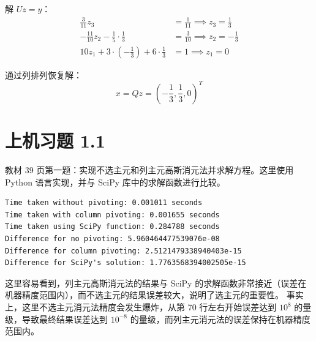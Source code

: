 \documentclass{article}
\begin{document}
\begin{solution}
  解 $Uz = y$：
  \begin{align*}
    \frac{3}{11} z_3 &= \frac{1}{11} \implies z_3 = \frac{1}{3} \\
    -\frac{11}{10} z_2 - \frac{1}{5} \cdot \frac{1}{3} &=
    \frac{3}{10} \implies z_2 = -\frac{1}{3} \\
    10 z_1 + 3 \cdot \left(-\frac{1}{3}\right) + 6 \cdot \frac{1}{3} &= 1
    \implies z_1 = 0
  \end{align*}

  通过列排列恢复解：
  \[
    x = Qz = \boxed{\left( -\frac{1}{3}, \frac{1}{3}, 0\right)^T}
  \]
\end{solution}

\section{上机习题 1.1}

教材 39 页第一题：实现不选主元和列主元高斯消元法并求解方程。这里使用 Python 语言实现，并与 SciPy 库中的求解函数进行比较。



\begin{lstlisting}[language={},caption=运行结果]
Time taken without pivoting: 0.001011 seconds
Time taken with column pivoting: 0.001655 seconds
Time taken using SciPy function: 0.284788 seconds
Difference for no pivoting: 5.960464477539076e-08
Difference for column pivoting: 2.5121479338940403e-15
Difference for SciPy's solution: 1.7763568394002505e-15
\end{lstlisting}

这里容易看到，列主元高斯消元法的结果与 SciPy 的求解函数非常接近（误差在机器精度范围内），而不选主元的结果误差较大，说明了选主元的重要性。
事实上，这里不选主元消元法精度会发生爆炸，从第 70 行左右开始误差达到 $10^8$ 的量级，导致最终结果误差达到 $10^{-8}$ 的量级，而列主元消元法的误差保持在机器精度范围内。
\end{document}
